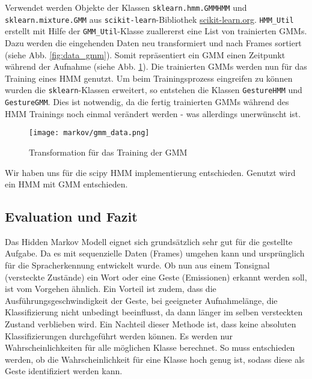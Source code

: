 Verwendet werden Objekte der Klassen \texttt{sklearn.hmm.GMMHMM} und \texttt{sklearn.mixture.GMM} aus \texttt{scikit-learn}-Bibliothek \url{scikit-learn.org}.
\texttt{HMM\_Util} erstellt mit Hilfe der \texttt{GMM\_Util}-Klasse zuallererst eine List von trainierten \acl{GMM}s. Dazu werden die eingehenden Daten 
neu transformiert und nach Frames sortiert (siehe Abb. \ref{fig:data_gmm}). Somit repräsentiert ein \acl{GMM} einen Zeitpunkt während der Aufnahme 
(siehe Abb. \ref{fig:gmm_data}). Die trainierten \acl{GMM}s werden nun für das Training eines \acl{HMM} genutzt. Um beim Trainingsprozess eingreifen zu können
wurden die \texttt{sklearn}-Klassen erweitert, so entstehen die Klassen \texttt{GestureHMM} und \texttt{GestureGMM}. Dies ist notwendig, da die fertig trainierten
\acl{GMM}s während des \acl{HMM} Trainings noch einmal verändert werden - was allerdings unerwünscht ist. 

\begin{figure}[htbp] \centering
    \texttt{[image: markov/gmm\_data.png]}
    \caption{Transformation für das Training der \acl{GMM}}
    \label{fig:gmm_data}
\end{figure}


Wir haben uns für die scipy HMM implementierung entschieden. 
Genutzt wird ein \acl{HMM} mit \acl{GMM} entschieden.


\subsection{Evaluation und Fazit}  \label{sec:result}
Das Hidden Markov Modell eignet sich grundsätzlich sehr gut für die gestellte Aufgabe. Da es mit sequenzielle Daten (Frames) umgehen 
kann und ursprünglich für die Spracherkennung entwickelt wurde. Ob nun aus einem Tonsignal (versteckte Zustände) ein Wort oder 
eine Geste (Emissionen) erkannt werden soll, ist vom Vorgehen ähnlich. Ein Vorteil ist zudem, dass die Ausführungsgeschwindigkeit
 der Geste, bei geeigneter Aufnahmelänge, die Klassifizierung nicht unbedingt beeinflusst, da dann länger im selben versteckten 
 Zustand verblieben wird.
Ein Nachteil dieser Methode ist, dass keine absoluten Klassifizierungen durchgeführt werden können. Es werden nur Wahrscheinlichkeiten für alle möglichen Klasse berechnet. 
So muss entschieden werden, ob die Wahrscheinlichkeit für eine Klasse hoch genug ist, sodass diese als Geste identifiziert werden kann.


